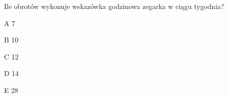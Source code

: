 \begin{tresc}
Ile obrotów wykonuje wskazówka godzinowa zegarka w ciągu tygodnia?
\end{tresc}
\begin{wariant}{A} 7 \end{wariant}
\begin{wariant}{B} 10 \end{wariant}
\begin{wariant}{C} 12 \end{wariant}
\begin{wariant}{D} 14 \end{wariant}
\begin{wariant}{E} 28 \end{wariant}
